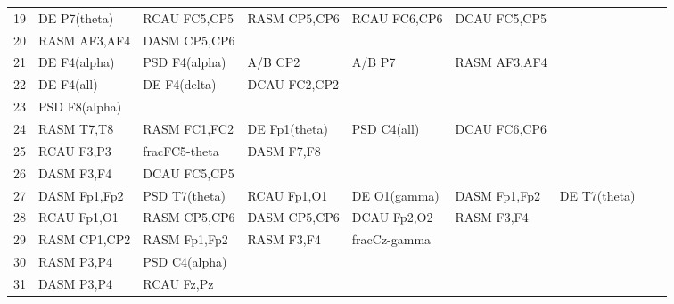 \begin{landscape}
\begin{table}[]
\begin{tabular}{l|llllllll}
19                 & DE P7(theta)         & RCAU FC5,CP5            & RASM CP5,CP6         & RCAU FC6,CP6       & DCAU FC5,CP5          &                      &                 &                 \\
20                 & RASM AF3,AF4         & DASM CP5,CP6            &                      &                    &                       &                      &                 &                 \\
21                 & DE F4(alpha)         & PSD F4(alpha)           & A/B CP2              & A/B P7             & RASM AF3,AF4          &                      &                 &                 \\
22                 & DE F4(all)           & DE F4(delta)            & DCAU FC2,CP2         &                    &                       &                      &                 &                 \\
23                 & PSD F8(alpha)        &                         &                      &                    &                       &                      &                 &                 \\
24                 & RASM T7,T8           & RASM FC1,FC2            & DE Fp1(theta)        & PSD C4(all)        & DCAU FC6,CP6          &                      &                 &                 \\
25                 & RCAU F3,P3           & fracFC5-theta           & DASM F7,F8           &                    &                       &                      &                 &                 \\
26                 & DASM F3,F4           & DCAU FC5,CP5            &                      &                    &                       &                      &                 &                 \\
27                 & DASM Fp1,Fp2         & PSD T7(theta)           & RCAU Fp1,O1          & DE O1(gamma)       & DASM Fp1,Fp2          & DE T7(theta)         &                 &                 \\
28                 & RCAU Fp1,O1          & RASM CP5,CP6            & DASM CP5,CP6         & DCAU Fp2,O2        & RASM F3,F4            &                      &                 &                 \\
29                 & RASM CP1,CP2         & RASM Fp1,Fp2            & RASM F3,F4           & fracCz-gamma       &                       &                      &                 &                 \\
30                 & RASM P3,P4           & PSD C4(alpha)           &                      &                    &                       &                      &                 &                 \\
31                 & DASM P3,P4           & RCAU Fz,Pz              &                      &                    &                       &                      &                 &                 \\
\end{tabular}
\end{table}
\end{landscape}
